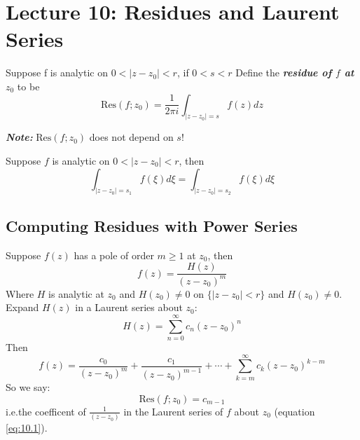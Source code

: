 \chapter{Lecture 10: Residues and Laurent Series} %

\begin{definition}
    [Residue]
    Suppose f is analytic on $0 < |z - z_0| < r$, if $0 < s < r$ Define the \textbf{\textit{residue of $f$ at $z_0$}} to be
    $$\text{Res}(f;z_0) = \frac{1}{2\pi i} \int_{|z - z_0| = s} f(z) dz$$
\end{definition}

\begin{remark}
    \textbf{\textit{Note:}} $\text{Res}(f; z_0)$ does not depend on $s$!
\end{remark}

\begin{theorem}
     Suppose $f$ is analytic on $0 < |z - z_0| < r$, then
    $$\int_{|z - z_0| = s_1}f(\xi) d\xi = \int_{|z - z_0| = s_2}f(\xi) d\xi$$
\end{theorem}

\section{Computing Residues with Power Series}

\begin{theorem}

    Suppose $f(z)$ has a pole of order $m \geq 1 $ at $z_0$, then
    \begin{equation}
        f(z) = \frac{H(z)}{(z - z_0)^m}
    \end{equation}
    Where $H$ is analytic at $z_0$ and $H(z_0) \neq 0$ on $\{|z-z_0| < r\}$ and $H(z_0) \neq 0$.
    Expand $H(z)$ in a Laurent series about $z_0$:
    $$H(z) = \sum_{n=0}^{\infty} c_n(z - z_0)^n$$
    Then
    \begin{equation}
        \boxed{f(z) = \frac{c_0}{(z - z_0)^m} + \frac{c_1}{(z - z_0)^{m-1}} + \cdots + \sum_{k=m}^{\infty} c_k(z - z_0)^{k-m}}
        \label{eq:10.1}
    \end{equation}
    So we say:
    \begin{equation*}
        \text{Res}(f; z_0) = c_{m-1}
    \end{equation*}
    i.e.the coefficent of $\frac{1}{(z - z_0)}$ in the Laurent series of $f$ about $z_0$ (equation \ref{eq:10.1}).
\end{theorem}

